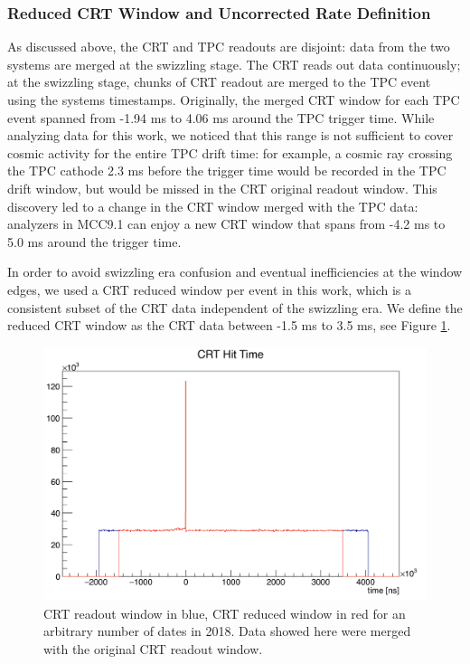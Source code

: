 \subsubsection{Reduced CRT Window and  Uncorrected Rate Definition}\label{sec:RateDef}
As discussed above, the CRT and TPC readouts are disjoint: data from the two systems are merged at the swizzling stage.  
The CRT reads out data continuously; at the swizzling stage, chunks of CRT readout are merged to the TPC event using the systems timestamps.
Originally, the merged CRT window for each TPC event spanned from -1.94 ms to 4.06 ms around the TPC trigger time. While analyzing data for this work, we noticed that this range is not sufficient to cover cosmic activity for the entire TPC drift time: for example, a cosmic ray crossing the TPC cathode 2.3 ms before the trigger time would be recorded in the TPC drift window, but would be missed in the CRT original readout window. This discovery led to a change in the CRT window merged with the TPC data: analyzers in MCC9.1 can enjoy a new CRT window that spans from -4.2 ms to 5.0 ms around the trigger time. 

In order to avoid swizzling era confusion and  eventual inefficiencies at the window edges,  we used a CRT reduced window per event in this work, which is a consistent subset of the CRT data independent of the swizzling era. We define the reduced CRT window as the CRT data between -1.5 ms to 3.5 ms, see Figure \ref{fig:ReadOutWindow}. 


\begin{figure}[h!]
\centering
\includegraphics[scale=0.4]{images/window.png}
\caption{CRT readout window in blue, CRT reduced window in red for an arbitrary number of dates in 2018. Data showed here were merged with the original CRT readout window.}
\label{fig:ReadOutWindow}
\end{figure}


